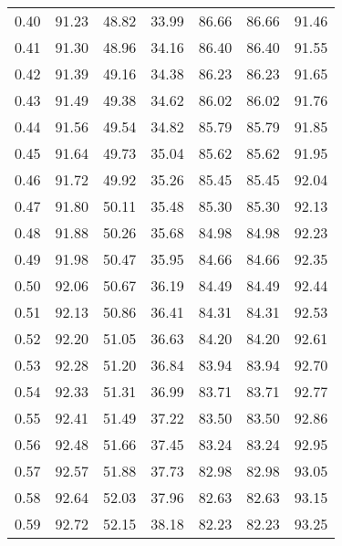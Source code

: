 \begin{tabular}{|c|c|c|c|c|c|c|}
      0.40 &     91.23 &     48.82 &      33.99 &   86.66 &      86.66 &         91.46 \\
      0.41 &     91.30 &     48.96 &      34.16 &   86.40 &      86.40 &         91.55 \\
      0.42 &     91.39 &     49.16 &      34.38 &   86.23 &      86.23 &         91.65 \\
      0.43 &     91.49 &     49.38 &      34.62 &   86.02 &      86.02 &         91.76 \\
      0.44 &     91.56 &     49.54 &      34.82 &   85.79 &      85.79 &         91.85 \\
      0.45 &     91.64 &     49.73 &      35.04 &   85.62 &      85.62 &         91.95 \\
      0.46 &     91.72 &     49.92 &      35.26 &   85.45 &      85.45 &         92.04 \\
      0.47 &     91.80 &     50.11 &      35.48 &   85.30 &      85.30 &         92.13 \\
      0.48 &     91.88 &     50.26 &      35.68 &   84.98 &      84.98 &         92.23 \\
      0.49 &     91.98 &     50.47 &      35.95 &   84.66 &      84.66 &         92.35 \\
      0.50 &     92.06 &     50.67 &      36.19 &   84.49 &      84.49 &         92.44 \\
      0.51 &     92.13 &     50.86 &      36.41 &   84.31 &      84.31 &         92.53 \\
      0.52 &     92.20 &     51.05 &      36.63 &   84.20 &      84.20 &         92.61 \\
      0.53 &     92.28 &     51.20 &      36.84 &   83.94 &      83.94 &         92.70 \\
      0.54 &     92.33 &     51.31 &      36.99 &   83.71 &      83.71 &         92.77 \\
      0.55 &     92.41 &     51.49 &      37.22 &   83.50 &      83.50 &         92.86 \\
      0.56 &     92.48 &     51.66 &      37.45 &   83.24 &      83.24 &         92.95 \\
      0.57 &     92.57 &     51.88 &      37.73 &   82.98 &      82.98 &         93.05 \\
      0.58 &     92.64 &     52.03 &      37.96 &   82.63 &      82.63 &         93.15 \\
      0.59 &     92.72 &     52.15 &      38.18 &   82.23 &      82.23 &         93.25 \\

\end{tabular}
